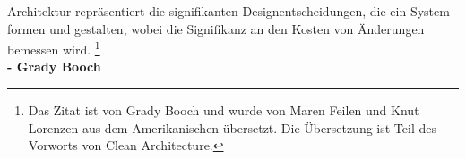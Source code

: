 
\thispagestyle{plain}
\begin{titlepage}

\begin{center}

\large{
    Architektur repräsentiert die signifikanten Designentscheidungen,
    die ein System formen und gestalten,
    wobei die Signifikanz an den Kosten von Änderungen bemessen wird.
    \footnote{Das Zitat ist von Grady Booch und wurde von Maren Feilen
    und Knut Lorenzen aus dem Amerikanischen übersetzt. Die Übersetzung ist Teil
    des Vorworts von Clean Architecture.\cite[S. 17]{RobertC.Martin2018}}
}\\[2ex]
\small{\textbf{- Grady Booch}}
\end{center}

\end{titlepage}

\restoregeometry
